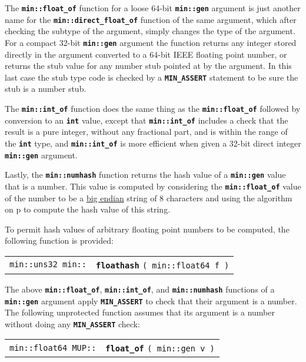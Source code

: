 \documentclass[12pt]{article}
\makeatletter
\newcommand{\TT}[1]{{\tt \bfseries #1}}
\newcommand{\ttindex}[1]{\index{#1@{\tt #1}}}
\newcommand{\minindex}[1]{\ttindex{min::#1}\ttindex{#1}}
\newcommand{\MUPindex}[1]{\ttindex{MUP::#1}\ttindex{#1}}
\newcommand{\pagref}[1]{p\pageref{#1}}
\newenvironment{indpar}[1][0.3in]%
	{\begin{list}{}%
		     {\setlength{\itemsep}{0in}%
		      \setlength{\topsep}{0in}%
		      \setlength{\parsep}{1ex}%
		      \setlength{\labelwidth}{#1}%
		      \setlength{\leftmargin}{#1}%
		      \addtolength{\leftmargin}{\labelsep}}%
	 \item}%
	{\end{list}}
\newcommand{\LABEL}[1]{\label{#1}}
\newcommand{\MINKEY}[1]{{\tt \bf #1}\minindex{#1}}
\newcommand{\MUPKEY}[1]{{\tt \bf #1}\MUPindex{#1}}
\makeatother
\begin{document}
The \TT{min::float\_of} function for a loose 64-bit \TT{min::gen}
argument is just another name for the \TT{min::direct\_float\_of} function
of the same argument, which after checking the subtype of the argument,
simply changes the type of the argument.
For a compact 32-bit \TT{min::gen} argument the
function returns any integer stored directly
in the argument converted to a 64-bit IEEE floating point number, or
returns the stub value for any number stub pointed at by the argument.
In this last case the stub type code is checked by a \TT{MIN\_ASSERT}
statement to be sure the stub is a number stub.

The \TT{min::int\_of} function does the same thing as the
\TT{min::float\_of} followed by conversion to an \TT{int} value,
except that \TT{min::int\_of} includes a check that the result
is a pure integer, without any fractional part, and is within the
range of the \TT{int} type, and
\TT{min::int\_of} is more efficient when given a 32-bit direct integer
\TT{min::gen} argument.

Lastly, the \TT{min::numhash} function
returns the hash value of a \TT{min::gen}
value that is a number.  This value is computed by considering
the \TT{min::float\_of} value of the number
to be a \underline{big endian} string of 8 characters and using the algorithm
on \pagref{HASH-ALGORITHM} to compute the hash value of this string.%
\label{NUMBER-HASH-ALGORITHM}

To permit hash values of arbitrary floating point numbers to be computed,
the following function is provided:

\begin{indpar}\begin{tabular}{r@{}l}
\verb|min::uns32 min::| & \MINKEY{floathash} \verb|( min::float64 f )|
\LABEL{MIN::FLOATHASH} \\
\end{tabular}\end{indpar}

The above \TT{min::float\_of}, \TT{min::int\_of}, and \TT{min::numhash}
functions of a \TT{min::gen} argument apply \TT{MIN\_ASSERT} to check
that their argument is a number.  The following unprotected function assumes
that its argument is a number without doing any \TT{MIN\_ASSERT} check:

\begin{indpar}\begin{tabular}{r@{}l}
\verb|min::float64 MUP::| & \MUPKEY{float\_of} \verb|( min::gen v )|
\LABEL{MUP::FLOAT_OF_GEN}
\end{tabular}\end{indpar}
\end{document}
